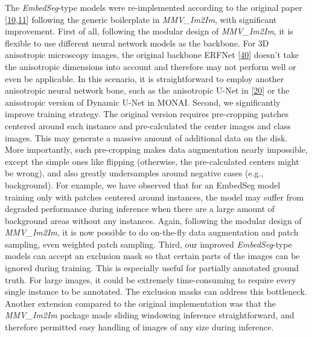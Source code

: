 The \emph{EmbedSeg}-type models were re-implemented according to the original paper {[}\protect\hyperlink{ref-K2ugNcVa}{10},\protect\hyperlink{ref-QmYuUQ5K}{11}{]} following the generic boilerplate in \emph{MMV\_Im2Im}, with significant improvement. First of all, following the modular design of \emph{MMV\_Im2Im}, it is flexible to use different neural network models as the backbone. For 3D anisotropic microscopy images, the original backbone ERFNet {[}\protect\hyperlink{ref-XAkgs3Nh}{40}{]} doesn't take the anisotropic dimensions into account and therefore may not perform well or even be applicable. In this scenario, it is straightforward to employ another anisotropic neural network bone, such as the anisotropic U-Net in {[}\protect\hyperlink{ref-jM3v1UjQ}{20}{]} or the anisotropic version of Dynamic U-Net in MONAI. Second, we significantly improve training strategy. The original version requires pre-cropping patches centered around each instance and pre-calculated the center images and class images. This may generate a massive amount of additional data on the disk. More importantly, such pre-cropping makes data augmentation nearly impossible, except the simple ones like flipping (otherwise, the pre-calculated centers might be wrong), and also greatly undersamples around negative cases (e.g., background). For example, we have observed that for an EmbedSeg model training only with patches centered around instances, the model may suffer from degraded performance during inference when there are a large amount of background areas without any instances. Again, following the modular design of \emph{MMV\_Im2Im}, it is now possible to do on-the-fly data augmentation and patch sampling, even weighted patch sampling. Third, our improved \emph{EmbedSeg}-type models can accept an exclusion mask so that certain parts of the images can be ignored during training. This is especially useful for partially annotated ground truth. For large images, it could be extremely time-consuming to require every single instance to be annotated. The exclusion masks can address this bottleneck. Another extension compared to the original implementation was that the \emph{MMV\_Im2Im} package made sliding windowing inference straightforward, and therefore permitted easy handling of images of any size during inference.

